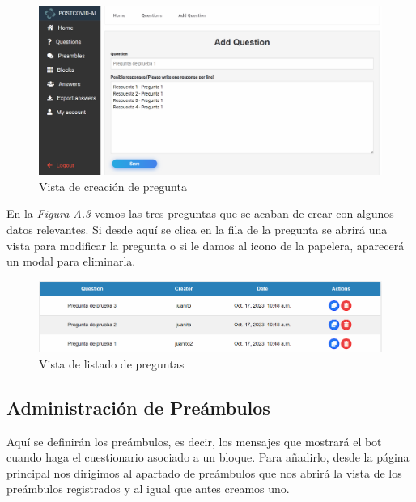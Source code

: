 \begin{figure}[!ht]
    \centering
    \includegraphics[width=1\textwidth]{imagenes/creacion_pregunta.png}
    \caption{ Vista de creación de pregunta }
    \label{fig:creacion_pregunta}
\end{figure}
 

En la \textit{\hyperref[fig:listado-preg]{Figura A.3}} vemos las tres preguntas que se acaban de crear con algunos datos relevantes. Si desde aquí se clica en la fila de la pregunta se abrirá una vista para modificar la pregunta o si le damos al icono de la papelera, aparecerá un modal para eliminarla.\vspace{0.5cm}

\begin{figure}[!ht]
    \centering
    \includegraphics[width=1\textwidth]{imagenes/preguntas_prueba.png}
    \caption{ Vista de listado de preguntas }
    \label{fig:listado-preg}
\end{figure}\vspace{1cm}

\subsection{Administración de Preámbulos}

Aquí se definirán los preámbulos, es decir, los mensajes que mostrará el bot cuando haga el cuestionario asociado a un bloque. Para añadirlo, desde la página principal nos dirigimos al apartado de preámbulos que nos abrirá la vista de los preámbulos registrados y al igual que antes creamos uno. 

